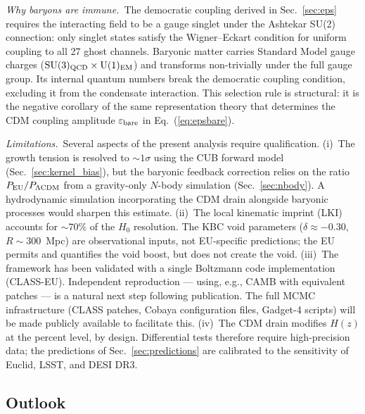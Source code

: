 \documentclass[a4paper,fleqn]{cas-dc}
\begin{document}
\textit{Why baryons are immune.}~The democratic coupling
derived in Sec.~\ref{sec:eps} requires the interacting
field to be a gauge singlet under the Ashtekar SU(2)
connection: only singlet states satisfy the
Wigner--Eckart condition for uniform coupling to all
27 ghost channels. Baryonic matter carries Standard
Model gauge charges
($\mathrm{SU}(3)_{\rm QCD} \times \mathrm{U}(1)_{\rm EM}$)
and transforms non-trivially under the full gauge group.
Its internal quantum numbers break the democratic
coupling condition, excluding it from the condensate
interaction. This selection rule is structural: it is
the negative corollary of the same representation
theory that determines the CDM coupling amplitude
$\varepsilon_{\rm bare}$ in Eq.~(\ref{eq:epsbare}).

\textit{Limitations.}~Several aspects of the present
analysis require qualification.
(i)~The growth tension is resolved to
$\sim\!1\sigma$ using the CUB forward model
(Sec.~\ref{sec:kernel_bias}), but the baryonic
feedback correction relies on the ratio
$P_{\rm EU}/P_{\Lambda{\rm CDM}}$ from a
gravity-only $N$-body simulation
(Sec.~\ref{sec:nbody}). A hydrodynamic simulation
incorporating the CDM drain alongside baryonic
processes would sharpen this estimate.
(ii)~The local kinematic imprint (LKI) accounts for
$\sim\!70\%$ of the $H_0$ resolution.
The KBC void parameters ($\delta \approx -0.30$,
$R \sim 300$~Mpc) are observational inputs, not
EU-specific predictions; the EU permits and
quantifies the void boost, but does not create
the void.
(iii)~The framework has been validated with a single
Boltzmann code implementation (CLASS-EU).
Independent reproduction --- using, e.g., CAMB with
equivalent patches --- is a natural next step
following publication. The full MCMC infrastructure
(CLASS patches, Cobaya configuration files,
Gadget-4 scripts) will be made publicly available
to facilitate this.
(iv)~The CDM drain modifies $H(z)$ at the percent
level, by design. Differential tests therefore
require high-precision data; the predictions of
Sec.~\ref{sec:predictions} are calibrated to the
sensitivity of Euclid, LSST, and DESI DR3.

\subsection{Outlook}
\label{sec:outlook}
\end{document}
